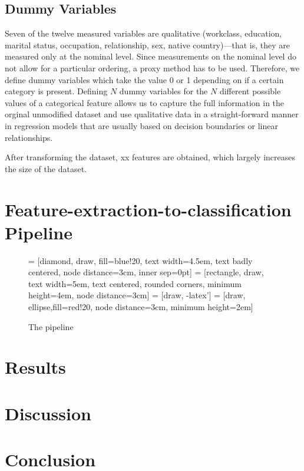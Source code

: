 \documentclass{scrartcl}
\begin{document}
\subsection{Dummy Variables}

Seven of the twelve measured variables are qualitative (workclass,
education, marital status, occupation, relationship, sex, native
country)---that is, they are measured only at the nominal level. Since
measurements on the nominal level do not allow for a particular
ordering, a proxy method has to be used. Therefore, we define dummy
variables which take the value 0 or 1 depending on if a certain
category is present. Defining $N$ dummy variables for the $N$
different possible values of a categorical feature allows us to
capture the full information in the orginal unmodified dataset and use
qualitative data in a straight-forward manner in regression models
that are usually based on decision boundaries or linear relationships.

After transforming the dataset, xx features are obtained, which
largely increases the size of the dataset.


\section{Feature-extraction-to-classification Pipeline}

\begin{figure}[h]
  \centering
 = [diamond, draw, fill=blue!20, 
    text width=4.5em, text badly centered, node distance=3cm, inner sep=0pt]
 = [rectangle, draw, 
    text width=5em, text centered, rounded corners, minimum
    height=4em, node distance=3cm]
 = [draw, -latex']
 = [draw, ellipse,fill=red!20, node distance=3cm,
    minimum height=2em]
  \caption{The pipeline}
  \label{fig:pipeline}
\end{figure}

\section{Results}
\label{sec:results}

\section{Discussion}
\label{sec:discussion}

\section{Conclusion}
\label{sec:conclusion}


\printbibliography
\appendix
\end{document}
